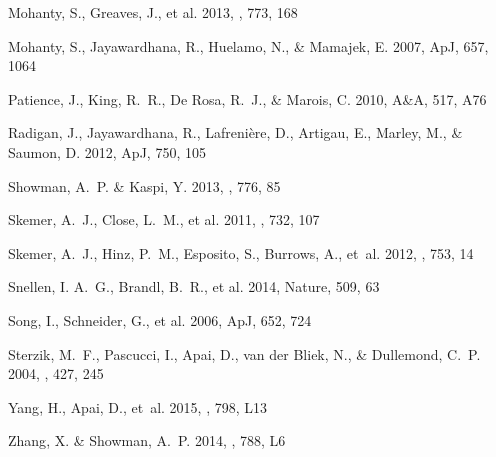\documentclass[apj]{emulateapj}
\begin{document}
\begin{thebibliography}{42}
{Mohanty}, S., {Greaves}, J., et al. 2013, \apj, 773,
  168

Mohanty, S., Jayawardhana, R., Huelamo, N., \& Mamajek, E. 2007, ApJ, 657, 1064

Patience, J., King, R.~R., {De Rosa}, R.~J., \& Marois, C. 2010, A\&A, 517, A76

Radigan, J., Jayawardhana, R., Lafreni\`{e}re, D., Artigau, E., Marley, M., \&
  Saumon, D. 2012, ApJ, 750, 105

{Showman}, A.~P. \& {Kaspi}, Y. 2013, \apj, 776, 85

{Skemer}, A.~J., {Close}, L.~M., et al. 2011, \apj, 732, 107

{Skemer}, A.~J., {Hinz}, P.~M., {Esposito}, S., {Burrows}, A., {et~al.} 2012,
  \apj, 753, 14

Snellen, I. A.~G., Brandl, B.~R., et al. 2014, Nature, 509, 63

Song, I., Schneider, G., et al. 2006, ApJ, 652, 724

{Sterzik}, M.~F., {Pascucci}, I., {Apai}, D., {van der Bliek}, N., \&
  {Dullemond}, C.~P. 2004, \aap, 427, 245

{Yang}, H., {Apai}, D., et~al. 2015, \apjl, 798, L13

{Zhang}, X. \& {Showman}, A.~P. 2014, \apjl, 788, L6

\end{thebibliography}
\end{document}
